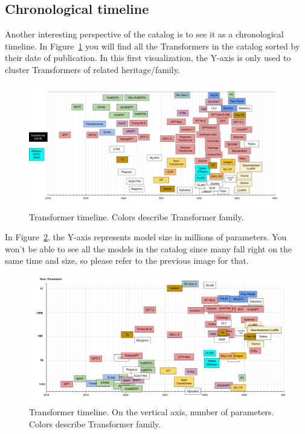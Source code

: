 \documentclass{article}
\begin{document}
\subsection{Chronological timeline}

Another interesting perspective of the catalog is to see it as a chronological timeline. In Figure~\ref{fig:timeline} you will find all the Transformers in the catalog sorted by their date of publication. In this first visualization, the Y-axis is only used to cluster Transformers of related heritage/family.

\begin{figure}
    \centering
    \includegraphics[width=\textwidth,height=\textheight,keepaspectratio]{02-06.png}
    \caption{Transformer timeline. Colors describe Transformer family.}
    \label{fig:timeline}
\end{figure}

In Figure~\ref{fig:timelineSize}, the Y-axis represents model size in millions of parameters. You won't be able to see all the models in the catalog since many fall right on the same time and size, so please refer to the previous image for that.

\begin{figure}
    \centering
    \includegraphics[width=\textwidth,height=\textheight,keepaspectratio]{02-09.png}
    \caption{Transformer timeline. On the vertical axis, number of parameters. Colors describe Transformer family.}
    \label{fig:timelineSize}
\end{figure}
\end{document}
